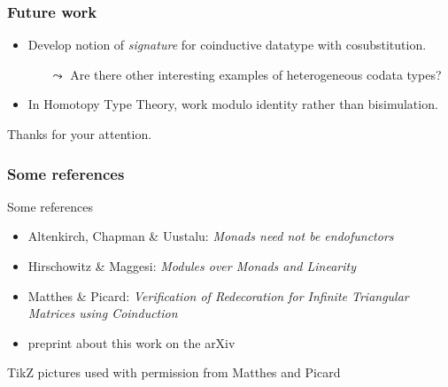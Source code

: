 \documentclass[
]
{beamer}
\newcommand{\constfont}[1]{\ensuremath{\mathsf{#1}}}
\newcommand{\M}{\constfont{M}}
\begin{document}
\begin{frame}
	\frametitle{Future work}
	
	\begin{itemize}\setlength{\itemsep}{1em}
	 \item Develop notion of \emph{signature} for coinductive datatype with cosubstitution.
	   \begin{itemize}
	      \item [$\leadsto$] Are there other interesting examples of heterogeneous codata types?
	   \end{itemize}
	 \item In Homotopy Type Theory, work modulo identity rather than bisimulation.
	\end{itemize}

	

\vspace{1em}

   \pause \begin{center} Thanks for your attention. \end{center}
\end{frame}

\begin{frame}
 \frametitle{Some references}
 
  
  
  \begin{block}{Some references}
   \begin{itemize}
    \item Altenkirch, Chapman \& Uustalu: \emph{Monads need not be endofunctors}
    \item Hirschowitz \& Maggesi: \emph{Modules over Monads and Linearity}
    \item Matthes \& Picard: \emph{Verification of Redecoration for Infinite Triangular Matrices using Coinduction}
    \item preprint about this work on the arXiv
   \end{itemize}
  \end{block}

  TikZ pictures used with permission from Matthes and Picard
 
\end{frame}
\end{document}
